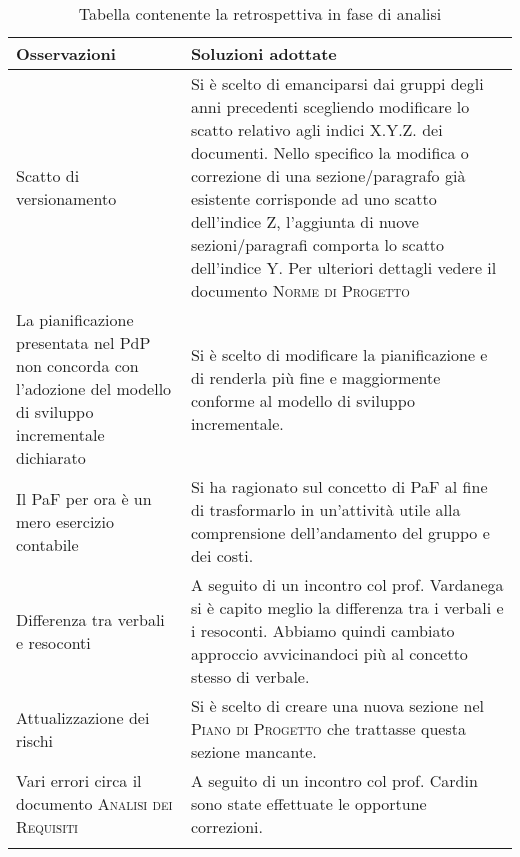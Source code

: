 \documentclass[../piano_di_qualifica.tex]{subfiles}
\begin{document}
\begin{center}
	\begin{longtable}{|p{5cm}|p{10cm}|}
		\hline
		\rowcolor{lightgray}
		\textbf{Osservazioni} & \textbf{Soluzioni adottate}  \\
		\hline
		Scatto di versionamento & 
		Si è scelto di emanciparsi dai gruppi degli anni precedenti scegliendo modificare 
		lo scatto relativo agli indici X.Y.Z. dei documenti. Nello specifico la modifica o correzione di una sezione/paragrafo già esistente
		corrisponde ad uno scatto dell'indice Z, l'aggiunta di nuove sezioni/paragrafi comporta lo scatto dell'indice Y.
		Per ulteriori dettagli vedere il documento \textsc{Norme di Progetto} \\

		La pianificazione presentata nel PdP non concorda con l’adozione del modello 
		di sviluppo incrementale dichiarato & 
		Si è scelto di modificare la pianificazione e di renderla più fine e maggiormente conforme al modello di 
		sviluppo incrementale. \\

		Il PaF per ora è un mero esercizio contabile &
		Si ha ragionato sul concetto di PaF al fine di trasformarlo in un'attività utile alla comprensione dell'andamento del gruppo e dei costi.\\

		Differenza tra verbali e resoconti &
		A seguito di un incontro col prof. Vardanega si è capito meglio la differenza tra i verbali e i resoconti. Abbiamo quindi cambiato approccio 
		avvicinandoci più al concetto stesso di verbale.\\

		Attualizzazione dei rischi &
		Si è scelto di creare una nuova sezione nel \textsc{Piano di Progetto} che trattasse questa sezione mancante.\\

		Vari errori circa il documento \textsc{Analisi dei Requisiti} &
		A seguito di un incontro col prof. Cardin sono state effettuate le opportune correzioni.\\

		\hline
		\rowcolor{white}
		\caption{Tabella contenente la retrospettiva in fase di analisi}
	\end{longtable}
\end{center}
\end{document}
